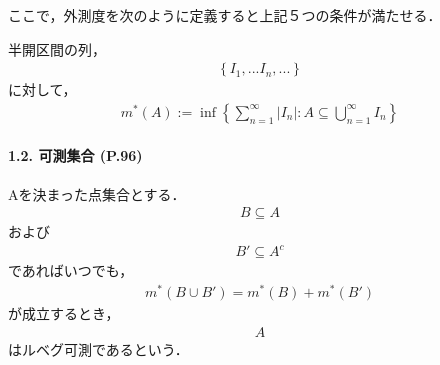 \documentclass[letterpaper,10pt,english]{sphinxmanual}
\begin{document}
\sphinxAtStartPar
ここで，外測度を次のように定義すると上記５つの条件が満たせる．

\sphinxAtStartPar
半開区間の列，
\begin{equation*}
\begin{split}\left \{ I_{1},... I_{n},... \right\}\end{split}
\end{equation*}
\sphinxAtStartPar
に対して，
\begin{equation*}
\begin{split}\begin{equation}
m^{\ast}(A):=\inf \left\{ \sum_{n=1}^{\infty} \left|I_{n}\right| : A \subseteq \bigcup_{n=1}^{\infty} I_{n} \right \}
\label{eq:16}\tag{1.1}
\end{equation}\end{split}
\end{equation*}

\paragraph{1.2. 可測集合 (P.96)}
\label{\detokenize{src/stochasticcalculus/2020-03-16-lebesgue:p-96}}
\sphinxAtStartPar
Aを決まった点集合とする．
\begin{equation*}
\begin{split}B \subseteq A\end{split}
\end{equation*}
\sphinxAtStartPar
および
\begin{equation*}
\begin{split}B' \subseteq A^{c}\end{split}
\end{equation*}
\sphinxAtStartPar
であればいつでも，
\begin{equation*}
\begin{split}\begin{equation}
m^{\ast}(B \cup B') = m^{\ast}(B) + m^{\ast}(B')
\label{eq:17}\tag{1.2}
\end{equation}\end{split}
\end{equation*}
\sphinxAtStartPar
が成立するとき，
\begin{equation*}
\begin{split}A\end{split}
\end{equation*}
\sphinxAtStartPar
はルベグ可測であるという．
\end{document}
